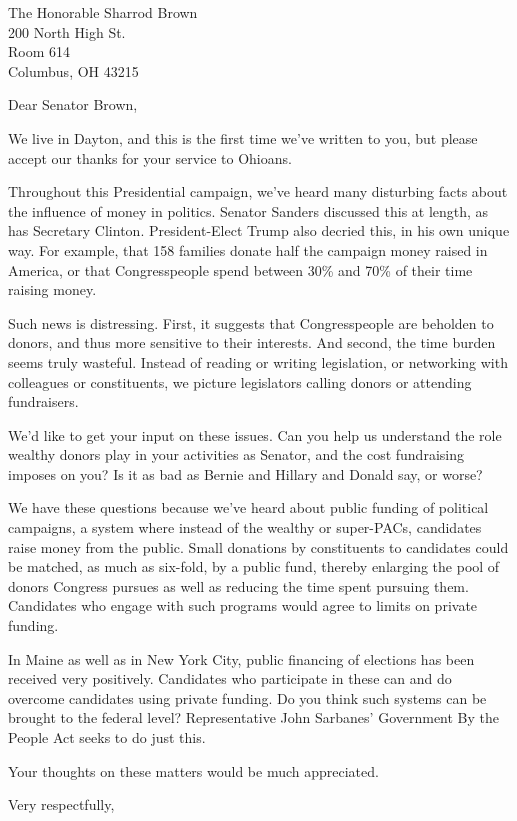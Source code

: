 \documentclass{letter}
\begin{document}
\begin{letter}{
  The Honorable Sharrod Brown \\
  200 North High St. \\
  Room 614 \\
  Columbus, OH 43215}

\opening{Dear Senator Brown,}

We live in Dayton, and this is the first time we've written to you, but please
accept our thanks for your service to Ohioans.

Throughout this Presidential campaign, we've heard many disturbing facts about
the influence of money in politics. Senator Sanders discussed this at length, as
has Secretary Clinton. President-Elect Trump also decried this, in his own
unique way. For example, that 158 families donate half the campaign money raised
in America, or that Congresspeople spend between 30\% and 70\% of their time
raising money.

Such news is distressing. First, it suggests that Congresspeople are beholden to
donors, and thus more sensitive to their interests. And second, the time burden
seems truly wasteful. Instead of reading or writing legislation, or networking
with colleagues or constituents, we picture legislators calling donors or
attending fundraisers.

We'd like to get your input on these issues. Can you help us understand the role
wealthy donors play in your activities as Senator, and the cost fundraising
imposes on you? Is it as bad as Bernie and Hillary and Donald say, or worse?

We have these questions because we've heard about public funding of political
campaigns, a system where instead of the wealthy or super-PACs, candidates raise
money from the public. Small donations by constituents to candidates could be
matched, as much as six-fold, by a public fund, thereby enlarging the pool of
donors Congress pursues as well as reducing the time spent pursuing them.
Candidates who engage with such programs would agree to limits on private
funding.

In Maine as well as in New York City, public financing of elections has been
received very positively. Candidates who participate in these can and do
overcome candidates using private funding. Do you think such systems can be
brought to the federal level? Representative John Sarbanes' Government By the
People Act seeks to do just this.

Your thoughts on these matters would be much appreciated.

\closing{Very respectfully,}


\end{letter}
\end{document}
